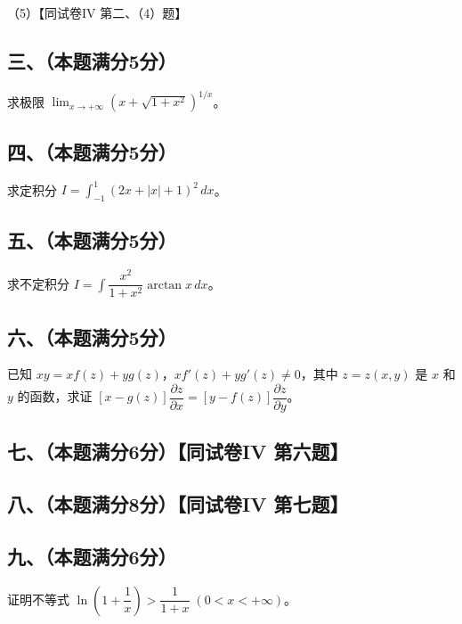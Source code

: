 \documentclass[UTF8,12pt]{ctexart}
\begin{document}
（5）【同试卷IV 第二、（4）题】


\subsection*{三、（本题满分5分）}

求极限 \(\displaystyle \lim_{x\to+\infty}(x+\sqrt{1+x^2})^{1/x}\)。


\subsection*{四、（本题满分5分）}

求定积分 \(\displaystyle I=\displaystyle \int_{-1}^1(2x+|x|+1)^2\,dx\)。


\subsection*{五、（本题满分5分）}

求不定积分 \(\displaystyle I=\displaystyle \int\dfrac{\displaystyle x^2}{\displaystyle 1+x^2}\arctan x\,dx\)。


\subsection*{六、（本题满分5分）}

已知 \(\displaystyle xy=xf(z)+yg(z)\)，\(\displaystyle xf\prime(z)+yg\prime(z)\ne0\)，其中 \(\displaystyle z=z(x,\allowbreak y)\) 是 \(\displaystyle x\) 和 \(\displaystyle y\) 的函数，求证 \(\displaystyle [x-g(z)]\dfrac{\displaystyle \partial z}{\displaystyle \partial x}=[y-f(z)]\dfrac{\displaystyle \partial z}{\displaystyle \partial y}\)。


\subsection*{七、（本题满分6分）【同试卷IV 第六题】}

\subsection*{八、（本题满分8分）【同试卷IV 第七题】}

\subsection*{九、（本题满分6分）}

证明不等式 \(\displaystyle \ln(1+\dfrac{\displaystyle 1}{\displaystyle x})>\dfrac{\displaystyle 1}{\displaystyle 1+x}\;(0<x<+\infty)\)。
\end{document}
